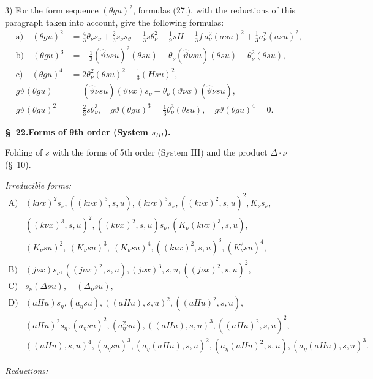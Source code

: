 \documentclass[11pt]{article}
\newcommand{\A}{\Delta}
\begin{document}
3) For the form sequence $(\theta gu)^2$, formulas (27.), with the reductions of this paragraph taken into account, give the following formulas:
\[
\tag{29}
\begin{aligned}
\text{a)}\quad (\theta gu)^2&=\frac43\theta_\nu s_\nu+\frac23s_\nu s_\vartheta-\frac13s\theta_\nu^2-\frac19sH-\frac13f\,a_\nu^2(asu)^2+\frac13a_\nu^2(asu)^2,\\
\text{b)}\quad (\theta gu)^3&=-\frac13(\widehat\vartheta\nu su)^2(\theta su)-\theta_\nu(\widehat\vartheta\nu su)(\theta su)-\theta_\nu^2(\theta su),\\
\text{c)}\quad (\theta gu)^4&=2\theta_\nu^2(\theta su)^2-\frac13(Hsu)^2,\\
g\vartheta(\theta gu)&=(\widehat\vartheta\nu su)(\vartheta\nu x)s_\nu-\theta_\nu(\vartheta\nu x)(\widehat\vartheta\nu su),\\
g\vartheta(\theta gu)^2&=\frac23s\theta_\nu^3,
\quad g\vartheta(\theta gu)^3=\frac13\theta_\nu^3(\theta su),
\quad g\vartheta(\theta gu)^4=0.
\end{aligned}
\]

\begin{center}
\textbf{\S\ 22.\quad Forms of 9th order (System $s_{III}$).}
\end{center}

Folding of $s$ with the forms of 5th order (System III) and the product $\A\cdot\nu$ (\S\ 10).

\noindent\emph{Irreducible forms:}
\[
\begin{array}{ll}
\text{A)}& (k\nu x)^2s_\nu,
((k\nu x)^3,s,u),
(k\nu x)^3s_\nu,
((k\nu x)^2,s,u)^2,
K_\nu s_\nu,\\
& ((k\nu x)^3,s,u)^2,
((k\nu x)^2,s,u)s_\nu,
(K_\nu(k\nu x)^3,s,u),\\
& (K_\nu su)^2,\ (K_\nu su)^3,\ (K_\nu su)^4,
((k\nu x)^2,s,u)^3,
(K_\nu^2su)^4,\\[0.3em]
\text{B)}& (j\nu x)s_\nu,
((j\nu x)^2,s,u),
(j\nu x)^3,s,u,
((j\nu x)^2,s,u)^2,\\[0.3em]
\text{C)}& s_\nu(\A su),\quad (\A_\nu su),\\[0.3em]
\text{D)}& (aHu)s_\eta,
(a_\eta su),
((aHu),s,u)^2,
((aHu)^2,s,u),\\
& (aHu)^2s_\eta,
(a_\eta su)^2,
(a_\eta^2su),
((aHu),s,u)^3,
((aHu)^2,s,u)^2,\\
& ((aHu),s,u)^4,
(a_\eta su)^3,
(a_\eta(aHu),s,u)^2,
(a_\eta(aHu)^2,s,u),
(a_\eta(aHu),s,u)^3.
\end{array}
\]

\noindent\emph{Reductions:}
\end{document}
